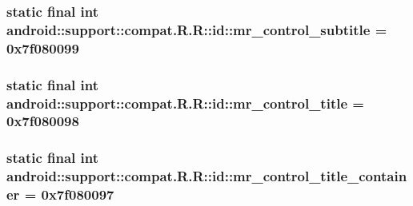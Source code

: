 \hypertarget{classandroid_1_1support_1_1compat_1_1_r_1_1id_9a088df416dbc6d1d70f1e2a03c99458}{
\subsubsection[{mr\_\-control\_\-subtitle}]{\setlength{\rightskip}{0pt plus 5cm}static final int android::support::compat.R.R::id::mr\_\-control\_\-subtitle = 0x7f080099}}
\label{classandroid_1_1support_1_1compat_1_1_r_1_1id_9a088df416dbc6d1d70f1e2a03c99458}


\hypertarget{classandroid_1_1support_1_1compat_1_1_r_1_1id_5e037c92f2c28a1db6d60c7e7ce14975}{
\subsubsection[{mr\_\-control\_\-title}]{\setlength{\rightskip}{0pt plus 5cm}static final int android::support::compat.R.R::id::mr\_\-control\_\-title = 0x7f080098}}
\label{classandroid_1_1support_1_1compat_1_1_r_1_1id_5e037c92f2c28a1db6d60c7e7ce14975}


\hypertarget{classandroid_1_1support_1_1compat_1_1_r_1_1id_283cd0c8f388b7e8916ef8491775e2be}{
\subsubsection[{mr\_\-control\_\-title\_\-container}]{\setlength{\rightskip}{0pt plus 5cm}static final int android::support::compat.R.R::id::mr\_\-control\_\-title\_\-container = 0x7f080097}}
\label{classandroid_1_1support_1_1compat_1_1_r_1_1id_283cd0c8f388b7e8916ef8491775e2be}


